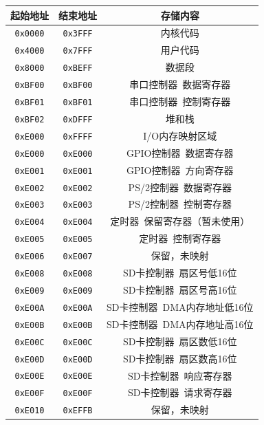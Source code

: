 \documentclass[11pt,utf8]{report}
\begin{document}
\begin{table}[H]
\centering
\begin{tabular}{c|c|c}
\toprule[1.2pt]
\textbf{起始地址} & \textbf{结束地址} & \textbf{存储内容} \\
\midrule[1.2pt]
\texttt{0x0000} & \texttt{0x3FFF} & 内核代码 \\ \hline
\texttt{0x4000} & \texttt{0x7FFF} & 用户代码 \\ \hline
\texttt{0x8000} & \texttt{0xBEFF} & 数据段 \\ \hline
\texttt{0xBF00} & \texttt{0xBF00} & 串口控制器~数据寄存器 \\ \hline
\texttt{0xBF01} & \texttt{0xBF01} & 串口控制器~控制寄存器 \\ \hline
\texttt{0xBF02} & \texttt{0xDFFF} & 堆和栈 \\ \hline
\texttt{0xE000} & \texttt{0xFFFF} & I/O内存映射区域 \\ \hline
\texttt{0xE000} & \texttt{0xE000} & GPIO控制器~数据寄存器 \\ \hline
\texttt{0xE001} & \texttt{0xE001} & GPIO控制器~方向寄存器 \\ \hline
\texttt{0xE002} & \texttt{0xE002} & PS/2控制器~数据寄存器 \\ \hline
\texttt{0xE003} & \texttt{0xE003} & PS/2控制器~控制寄存器 \\ \hline
\texttt{0xE004} & \texttt{0xE004} & 定时器~保留寄存器（暂未使用） \\ \hline
\texttt{0xE005} & \texttt{0xE005} & 定时器~控制寄存器 \\ \hline
\texttt{0xE006} & \texttt{0xE007} & 保留，未映射 \\ \hline
\texttt{0xE008} & \texttt{0xE008} & SD卡控制器~扇区号低16位 \\ \hline
\texttt{0xE009} & \texttt{0xE009} & SD卡控制器~扇区号高16位 \\ \hline
\texttt{0xE00A} & \texttt{0xE00A} & SD卡控制器~DMA内存地址低16位 \\ \hline
\texttt{0xE00B} & \texttt{0xE00B} & SD卡控制器~DMA内存地址高16位 \\ \hline
\texttt{0xE00C} & \texttt{0xE00C} & SD卡控制器~扇区数低16位 \\ \hline
\texttt{0xE00D} & \texttt{0xE00D} & SD卡控制器~扇区数高16位 \\ \hline
\texttt{0xE00E} & \texttt{0xE00E} & SD卡控制器~响应寄存器 \\ \hline
\texttt{0xE00F} & \texttt{0xE00F} & SD卡控制器~请求寄存器 \\ \hline
\texttt{0xE010} & \texttt{0xEFFB} & 保留，未映射 \\ \hline

\end{tabular}
\end{table}
\end{document}
